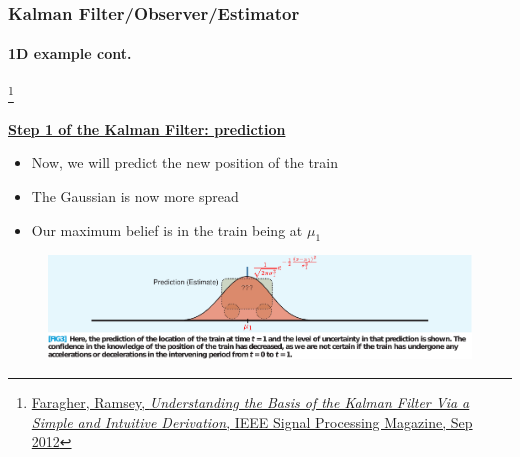 \begin{frame}[plain]
\frametitle{Kalman Filter/Observer/Estimator}
\framesubtitle{1D example \tiny cont.}

\footnote{\tiny\hspace{-0.23in} \href{http://www.cl.cam.ac.uk/~rmf25/papers/Understanding the Basis of the Kalman Filter.pdf}{Faragher, Ramsey, \emph{Understanding the Basis of the Kalman Filter Via a Simple and Intuitive Derivation}, IEEE Signal Processing Magazine, Sep 2012}}
\scriptsize
\begin{changemargin}{-1.3in}{0in}
\underline{\textbf{Step 1 of the Kalman Filter: prediction}}
\begin{itemize}\scriptsize
\item Now, we will predict the new position of the train
\item The Gaussian is now more spread
\item Our maximum belief is in the train being at {\color{red}$\mu_1$}
\end{itemize}
\begin{figure}[h]
\centering
\includegraphics[width=1.35\textwidth]{figs/2012_MAG_Understanding_the_Basis_of_the_Kalman_Filter_fig3.pdf}
\end{figure}
\end{changemargin}
\end{frame}


